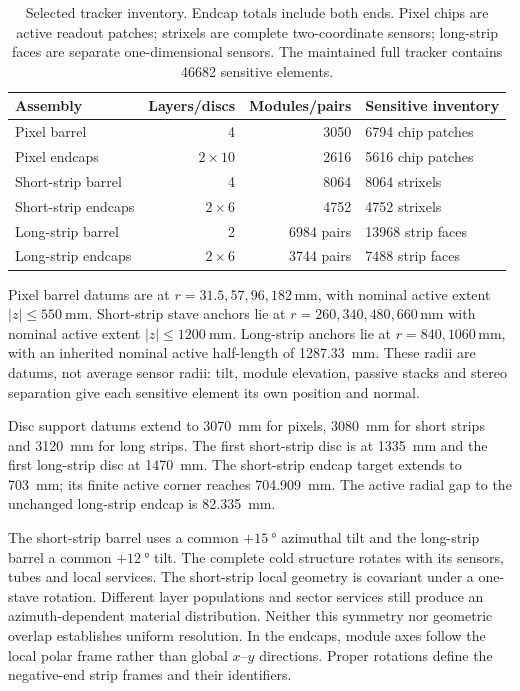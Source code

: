\begin{table}[tbp]
\centering\small
\caption{Selected tracker inventory. Endcap totals include both ends. Pixel
chips are active readout patches; strixels are complete two-coordinate sensors;
long-strip faces are separate one-dimensional sensors. The maintained full
tracker contains \num{46682} sensitive elements.}
\label{tab:tracker-inventory}
\begin{tabular}{@{}lrrp{58mm}@{}}\toprule
Assembly & Layers/discs & Modules/pairs & Sensitive inventory\\\midrule
Pixel barrel & 4 & \num{3050} & \num{6794} chip patches\\
Pixel endcaps & $2\times10$ & \num{2616} & \num{5616} chip patches\\
Short-strip barrel & 4 & \num{8064} & \num{8064} strixels\\
Short-strip endcaps & $2\times6$ & \num{4752} & \num{4752} strixels\\
Long-strip barrel & 2 & \num{6984} pairs & \num{13968} strip faces\\
Long-strip endcaps & $2\times6$ & \num{3744} pairs & \num{7488} strip faces\\\bottomrule
\end{tabular}
\end{table}

Pixel barrel datums are at $r=31.5,57,96,182\,\unit{\milli\metre}$, with nominal
active extent $|z|\leq\qty{550}{\milli\metre}$. Short-strip stave anchors lie at
$r=260,340,480,660\,\unit{\milli\metre}$ with nominal active extent
$|z|\leq\qty{1200}{\milli\metre}$. Long-strip anchors lie at
$r=840,1060\,\unit{\milli\metre}$, with an inherited nominal active half-length
of \qty{1287.33}{\milli\metre}. These radii are datums, not average sensor radii:
tilt, module elevation, passive stacks and stereo separation give each sensitive
element its own position and normal.

Disc support datums extend to \qty{3070}{\milli\metre} for pixels,
\qty{3080}{\milli\metre} for short strips and \qty{3120}{\milli\metre} for long
strips. The first short-strip disc is at \qty{1335}{\milli\metre} and the first
long-strip disc at \qty{1470}{\milli\metre}. The short-strip endcap target
extends to \qty{703}{\milli\metre}; its finite active corner reaches
\qty{704.909}{\milli\metre}. The active radial gap to the unchanged
long-strip endcap is \qty{82.335}{\milli\metre}.

The short-strip barrel uses a common $+\qty{15}{\degree}$ azimuthal tilt and the
long-strip barrel a common $+\qty{12}{\degree}$ tilt. The complete cold structure
rotates with its sensors, tubes and local services. The short-strip local geometry is covariant under a one-stave rotation. Different layer
populations and sector services still produce an azimuth-dependent material
distribution. Neither this symmetry nor geometric overlap establishes uniform
resolution. In the endcaps, module axes follow the local polar frame rather
than global $x$--$y$ directions. Proper rotations define the negative-end strip
frames and their identifiers.

